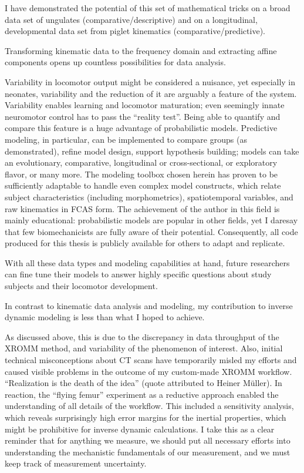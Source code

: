 I have demonstrated the potential of this set of mathematical tricks on a broad data set of ungulates (comparative/descriptive) and on a longitudinal, developmental data set from piglet kinematics (comparative/predictive).


Transforming kinematic data to the frequency domain and extracting affine components opens up countless possibilities for data analysis.

Variability in locomotor output might be considered a nuisance, yet especially in neonates, variability and the reduction of it are arguably a feature of the system.
Variability enables learning and locomotor maturation; even seemingly innate neuromotor control has to pass the ``reality test''.
Being able to quantify and compare this feature is a huge advantage of probabilistic models.
Predictive modeling, in particular, can be implemented to compare groups (as demonstrated), refine model design, support hypothesis building; models can take an evolutionary, comparative, longitudinal or cross-sectional, or exploratory flavor, or many more.
The modeling toolbox chosen herein has proven to be sufficiently adaptable to handle even complex model constructs, which relate subject characteristics (including morphometrics), spatiotemporal variables, and raw kinematics in FCAS form.
The achievement of the author in this field is mainly educational: probabilistic models are popular in other fields, yet I daresay that few biomechanicists are fully aware of their potential.
Consequently, all code produced for this thesis is publicly available for others to adapt and replicate.

With all these data types and modeling capabilities at hand, future researchers can fine tune their models to answer highly specific questions about study subjects and their locomotor development.


In contrast to kinematic data analysis and modeling, my contribution to inverse dynamic modeling is less than what I hoped to achieve.

As discussed above, this is due to the discrepancy in data throughput of the XROMM method, and variability of the phenomenon of interest.
Also, initial technical misconceptions about CT scans have temporarily misled my efforts and caused visible problems in the outcome of my custom-made XROMM workflow.
``Realization is the death of the idea'' (quote attributed to Heiner Müller).
In reaction, the ``flying femur'' experiment as a reductive approach enabled the understanding of all details of the workflow.
This included a sensitivity analysis, which reveals surprisingly high error margins for the inertial properties, which might be prohibitive for inverse dynamic calculations.
I take this as a clear reminder that for anything we measure, we should put all necessary efforts into understanding the mechanistic fundamentals of our measurement, and we must keep track of measurement uncertainty.

